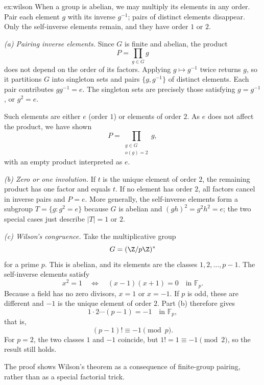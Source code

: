 \begin{solution}{ex:wilson}
\idea When a group is abelian, we may multiply its elements in any order. Pair each element $g$ with its inverse $g^{-1}$; pairs of distinct elements disappear. Only the self-inverse elements remain, and they have order $1$ or $2$.

\writeup \emph{(a) Pairing inverse elements.} Since $G$ is finite and abelian, the product
\[
P=\prod_{g\in G}g
\]
does not depend on the order of its factors. Applying $g\mapsto g^{-1}$ twice returns $g$, so it partitions $G$ into singleton sets and pairs $\{g,g^{-1}\}$ of distinct elements. Each pair contributes $gg^{-1}=e$. The singleton sets are precisely those satisfying $g=g^{-1}$, or $g^2=e$.

Such elements are either $e$ (order $1$) or elements of order $2$. As $e$ does not affect the product, we have shown
\[
\boxed{P=\prod_{\substack{g\in G\\o(g)=2}}g},
\]
with an empty product interpreted as $e$.

\emph{(b) Zero or one involution.} If $t$ is the unique element of order $2$, the remaining product has one factor and equals $t$. If no element has order $2$, all factors cancel in inverse pairs and $P=e$. More generally, the self-inverse elements form a subgroup $T=\{g:g^2=e\}$ because $G$ is abelian and $(gh)^2=g^2h^2=e$; the two special cases just describe $|T|=1$ or $2$.

\emph{(c) Wilson's congruence.} Take the multiplicative group
\[
G=(\Z/p\Z)^*
\]
for a prime $p$. This is abelian, and its elements are the classes $1,2,\ldots,p-1$. The self-inverse elements satisfy
\[
x^2=1\quad\Longleftrightarrow\quad(x-1)(x+1)=0\quad\text{in }\mathbb F_p.
\]
Because a field has no zero divisors, $x=1$ or $x=-1$. If $p$ is odd, these are different and $-1$ is the unique element of order $2$. Part (b) therefore gives
\[
1\cdot2\cdots(p-1)=-1\quad\text{in }\mathbb F_p,
\]
that is,
\[
\boxed{(p-1)!\equiv-1\pmod p}.
\]
For $p=2$, the two classes $1$ and $-1$ coincide, but $1!=1\equiv-1\pmod2$, so the result still holds.

The proof shows Wilson's theorem as a consequence of finite-group pairing, rather than as a special factorial trick.
\end{solution}

